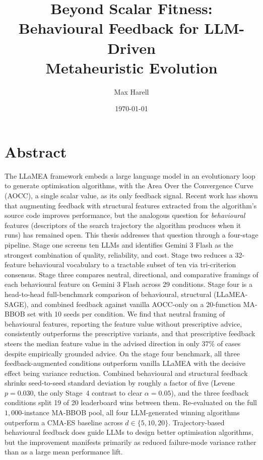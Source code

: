 \documentclass[10pt,a4paper,twocolumn]{article}
\title{Beyond Scalar Fitness:\\ Behavioural Feedback for LLM-Driven\\ Metaheuristic Evolution}
\author{Max Harell}
\date{\today}
\let\chapter\section
\let\section\subsection
\let\subsection\subsubsection
\let\subsubsection\paragraph
\begin{document}
\maketitle

\setcounter{page}{1}
\setcounter{section}{-1}
\chapter{Abstract}
The LLaMEA framework embeds a large language model in an evolutionary loop to generate optimisation algorithms, with the Area Over the Convergence Curve (AOCC), a single scalar value, as its only feedback signal. Recent work has shown that augmenting feedback with structural features extracted from the algorithm's source code improves performance, but the analogous question for \emph{behavioural} features (descriptors of the search trajectory the algorithm produces when it runs) has remained open. This thesis addresses that question through a four-stage pipeline. Stage one screens ten LLMs and identifies Gemini 3 Flash as the strongest combination of quality, reliability, and cost. Stage two reduces a 32-feature behavioural vocabulary to a tractable subset of ten via tri-criterion consensus. Stage three compares neutral, directional, and comparative framings of each behavioural feature on Gemini 3 Flash across 29 conditions. Stage four is a head-to-head full-benchmark comparison of behavioural, structural (LLaMEA-SAGE), and combined feedback against vanilla AOCC-only on a 20-function MA-BBOB set with 10 seeds per condition. We find that neutral framing of behavioural features, reporting the feature value without prescriptive advice, consistently outperforms the prescriptive variants, and that prescriptive feedback steers the median feature value in the advised direction in only 37\% of cases despite empirically grounded advice. On the stage four benchmark, all three feedback-augmented conditions outperform vanilla LLaMEA with the decisive effect being variance reduction. Combined behavioural and structural feedback shrinks seed-to-seed standard deviation by roughly a factor of five (Levene $p = 0.030$, the only Stage~4 contrast to clear $\alpha = 0.05$), and the three feedback conditions split 19 of 20 leaderboard wins between them. Re-evaluated on the full $1{,}000$-instance MA-BBOB pool, all four LLM-generated winning algorithms outperform a CMA-ES baseline across $d \in \{5, 10, 20\}$. Trajectory-based behavioural feedback does guide LLMs to design better optimisation algorithms, but the improvement manifests primarily as reduced failure-mode variance rather than as a large mean performance lift.












\appendix

\end{document}
